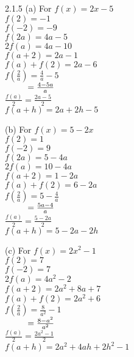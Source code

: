 \begin{Answer}{2.1.5}
(a) \hspace{2mm} For $f(x) = 2x-5$ \\
$f(2) = -1$\\
$f(-2) = -9$\\
$f(2a) = 4a-5$	\\
$2 f(a) = 4a-10$\\
$f(a+2) = 2a-1$\\
$f(a) + f(2) = 2a-6$\\
$f \left( \frac{2}{a} \right) = \frac{4}{a} - 5$ \\
$\hphantom{f \left( \frac{2}{a} \right)} = \frac{4-5a}{a}$\\
$\frac{f(a)}{2} =\frac{2a-5}{2}$\\
$f(a + h) = 2a + 2h - 5$\\

\vspace{3mm}

(b) \space{2mm} For $f(x) = 5-2x$\\
$f(2) = 1$\\
$f(-2) = 9$\\
$f(2a) = 5-4a$	\\
$2 f(a) = 10-4a$\\
$f(a+2) = 1-2a$\\
$f(a) + f(2) = 6-2a$\\
$f \left( \frac{2}{a} \right) = 5 - \frac{4}{a}$ \\
$\hphantom{f \left( \frac{2}{a} \right)} = \frac{5a-4}{a}$\\
$\frac{f(a)}{2} = \frac{5-2a}{2}$\\
$f(a + h) = 5-2a-2h$\\

\vspace{3mm}

(c) \hspace{2mm} For $f(x) = 2x^2-1$\\
$f(2) = 7$\\
$f(-2) = 7$\\
$2 f(a) = 4a^2-2$\\
$f(a+2) = 2a^2+8a+7$\\
$f(a) + f(2) = 2a^2+6$\\
$f \left( \frac{2}{a} \right) = \frac{8}{a^2} - 1$ \\
$\hphantom{f \left( \frac{2}{a} \right)} = \frac{8-a^2}{a^2}$\\
$\frac{f(a)}{2} =  \frac{2a^2-1}{2}$\\
$f(a + h) = 2a^2+4ah+2h^2-1$\\


\end{Answer}
